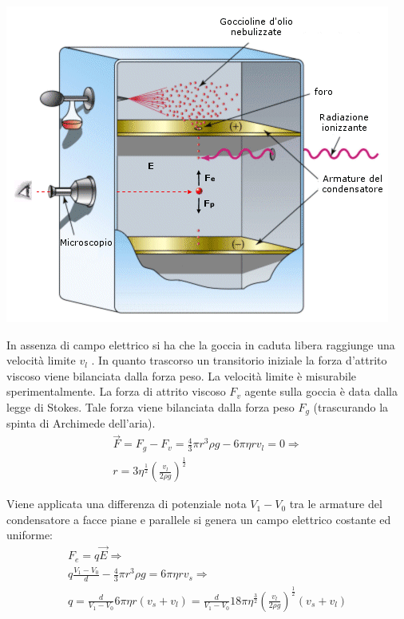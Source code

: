 \documentclass[a4paper,11pt,twoside,openany]{book}
\theoremstyle{definition}
\theoremstyle{plain}
\theoremstyle{plain}
\theoremstyle{definition}
\begin{document}
\begin{center}
\includegraphics[width=\textwidth]{immagini/millikan.jpg} %
\end{center}

In assenza di campo elettrico si ha che la goccia in caduta libera raggiunge una velocità limite $v_l$ . In quanto trascorso un transitorio iniziale la forza d'attrito viscoso viene bilanciata dalla forza peso. La velocità limite è misurabile sperimentalmente. La forza di attrito viscoso $F_v$ agente sulla goccia è data dalla legge di Stokes. Tale forza viene bilanciata dalla forza peso $F_g$ (trascurando la spinta di Archimede dell'aria).
\begin{equation}\begin{split}
\vec F=F_g-F_v=\frac{4}{3}\pi r^3\rho g-6\pi \eta r v_l=0 \Longrightarrow \\
r=3\eta ^{\frac{1}{2}} \left(\frac{v_l}{2\rho g}\right)^{\frac{1}{2}}
\end{split}\end{equation}

Viene applicata una differenza di potenziale nota $V_1-V_0$ tra le armature del condensatore a facce piane e parallele si genera un campo elettrico costante ed uniforme:
\begin{equation}\begin{split}
F_e=q\vec E \Longrightarrow \\
q\frac{V_1-V_0}{d}-\frac{4}{3}\pi r^3\rho g=6\pi \eta rv_s \Longrightarrow \\
q=\frac{d}{V_1-V_0}6\pi\eta r\left(v_s+v_l\right)=\frac{d}{V_1-V_0}18\pi\eta ^{\frac{3}{2}} \left(\frac{v_l}{2\rho g}\right)^{\frac{1}{2}} \left(v_s+v_l\right)
\end{split}\end{equation}
\end{document}

